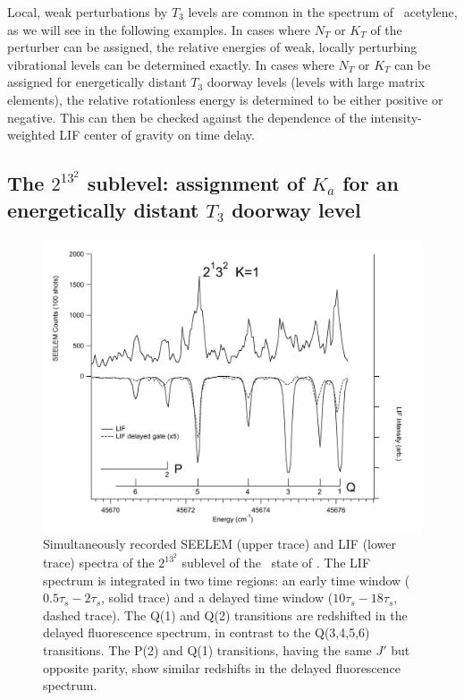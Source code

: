 \documentclass[12pt]{mitthesis}
\begin{document}
Local, weak perturbations by $T_3$ levels are common in the spectrum
of \astate\ acetylene, as we will see in the following examples.  In
cases where $N_T$ or $K_T$ of the perturber can be assigned, the
relative energies of weak, locally perturbing vibrational levels can
be determined exactly.  In cases where $N_T$ or $K_T$ can be assigned
for energetically distant $T_3$ doorway levels (levels with large
matrix elements), the relative rotationless energy is determined to be
either positive or negative.  This can then be checked against the
dependence of the intensity-weighted LIF center of gravity on time
delay.

\subsection{The $2^13^2$  sublevel: assignment of $K_a$ for an
  energetically distant $T_3$ doorway level}



\begin{figure}
  \caption{Simultaneously recorded SEELEM (upper trace) and LIF (lower
    trace) spectra of the $2^13^2$  sublevel of the \astate\
    state of .  The LIF spectrum is integrated in two time
    regions: an early time window ($0.5\tau_s-2\tau_s$, solid trace)
    and a delayed time window ($10\tau_s-18\tau_s$, dashed trace).
    The Q(1) and Q(2) transitions are redshifted in the delayed
    fluorescence spectrum, in contrast to the Q(3,4,5,6) transitions.
    The P(2) and Q(1) transitions, having the same $J'$ but opposite
    parity, show similar redshifts in the delayed fluorescence
    spectrum.}
  \label{fig:spectrum-2132}
  \centering
  \vspace{1cm}
  \includegraphics[width=7in,angle=90]{spectrum-2132-q6q1.pdf}
\end{figure}
\end{document}
